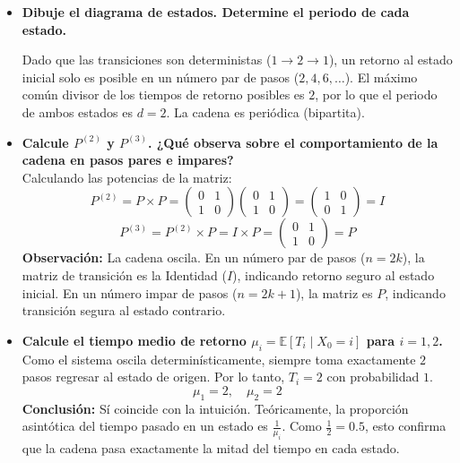 \documentclass[10pt,a4paper]{book}
\begin{document}
\begin{itemize}
    \item[\textbf{a)}] \textbf{Dibuje el diagrama de estados. Determine el periodo de cada estado.}
    \begin{center}
    \end{center}
    Dado que las transiciones son deterministas ($1 \to 2 \to 1$), un retorno al estado inicial solo es posible en un número par de pasos ($2, 4, 6, \dots$). El máximo común divisor de los tiempos de retorno posibles es $2$, por lo que el periodo de ambos estados es $d = 2$. La cadena es periódica (bipartita).

    \item[\textbf{b)}] \textbf{Calcule $P^{(2)}$ y $P^{(3)}$. ¿Qué observa sobre el comportamiento de la cadena en pasos pares e impares?} \\
    Calculando las potencias de la matriz:
    \[ P^{(2)} = P \times P = \begin{pmatrix} 0 & 1 \\ 1 & 0 \end{pmatrix} \begin{pmatrix} 0 & 1 \\ 1 & 0 \end{pmatrix} = \begin{pmatrix} 1 & 0 \\ 0 & 1 \end{pmatrix} = I \]
    \[ P^{(3)} = P^{(2)} \times P = I \times P = \begin{pmatrix} 0 & 1 \\ 1 & 0 \end{pmatrix} = P \]
    \textbf{Observación:} La cadena oscila. En un número par de pasos ($n=2k$), la matriz de transición es la Identidad ($I$), indicando retorno seguro al estado inicial. En un número impar de pasos ($n=2k+1$), la matriz es $P$, indicando transición segura al estado contrario.

    \item[\textbf{c)}] \textbf{Calcule el tiempo medio de retorno $\mu_i = \mathbb{E}[T_i \mid X_0 = i]$ para $i = 1, 2$.} \\
    Como el sistema oscila determinísticamente, siempre toma exactamente $2$ pasos regresar al estado de origen. Por lo tanto, $T_i = 2$ con probabilidad $1$.
    \[ \mu_1 = 2, \quad \mu_2 = 2 \]
    \textbf{Conclusión:} Sí coincide con la intuición. Teóricamente, la proporción asintótica del tiempo pasado en un estado es $\frac{1}{\mu_i}$. Como $\frac{1}{2} = 0.5$, esto confirma que la cadena pasa exactamente la mitad del tiempo en cada estado.


\end{itemize}
\end{document}
